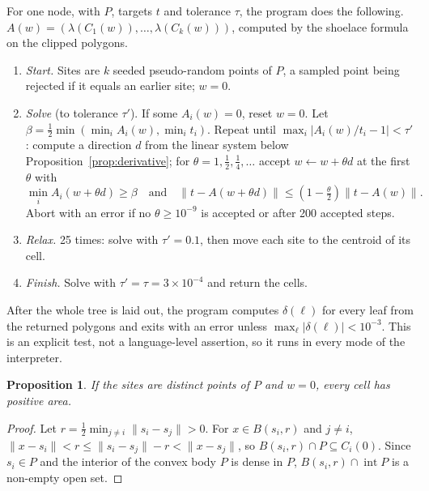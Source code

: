 \documentclass[11pt,a4paper]{article}
\theoremstyle{plain}
\newtheorem{proposition}[theorem]{Proposition}
\theoremstyle{definition}
\theoremstyle{remark}
\newcommand{\area}{\lambda}
\newcommand{\norm}[1]{\lVert #1\rVert}
\newcommand{\interior}{\operatorname{int}}
\begin{document}
For one node, with $P$, targets $t$ and tolerance $\tau$, the program does the
following. $A(w)=(\area(C_1(w)),\dots,\area(C_k(w)))$, computed by the
shoelace formula on the clipped polygons.

\begin{enumerate}[label=\arabic*.]
\item \emph{Start.} Sites are $k$ seeded pseudo-random points of $P$, a sampled point being rejected if it equals an earlier site; $w=0$.
\item \emph{Solve} (to tolerance $\tau'$). If some $A_i(w)=0$, reset $w=0$.
      Let $\beta=\tfrac12\min(\min_i A_i(w),\min_i t_i)$. Repeat until
      $\max_i\lvert A_i(w)/t_i-1\rvert<\tau'$: compute a direction $d$ from
      the linear system below Proposition~\ref{prop:derivative}; for
      $\theta=1,\tfrac12,\tfrac14,\dots$ accept $w\leftarrow w+\theta d$ at
      the first $\theta$ with
      \begin{equation}\label{eq:accept}
        \min_i A_i(w+\theta d)\ge\beta
        \quad\text{and}\quad
        \norm{t-A(w+\theta d)}\le(1-\tfrac\theta2)\norm{t-A(w)} .
      \end{equation}
      Abort with an error if no $\theta\ge 10^{-9}$ is accepted or after 200
      accepted steps.
\item \emph{Relax.} 25 times: solve with $\tau'=0.1$, then move each site to
      the centroid of its cell.
\item \emph{Finish.} Solve with $\tau'=\tau=3\times10^{-4}$ and return the
      cells.
\end{enumerate}
After the whole tree is laid out, the program computes $\delta(\ell)$ for
every leaf from the returned polygons and exits with an error unless
$\max_\ell\lvert\delta(\ell)\rvert<10^{-3}$. This is an explicit test, not a language-level assertion, so it runs in every mode of the interpreter.

\begin{proposition}\label{prop:voronoi}
If the sites are distinct points of $P$ and $w=0$, every cell has positive
area.
\end{proposition}
\begin{proof}
Let $r=\tfrac12\min_{j\ne i}\norm{s_i-s_j}>0$. For $x\in B(s_i,r)$ and $j\ne i$,
$\norm{x-s_i}<r\le\norm{s_i-s_j}-r<\norm{x-s_j}$, so
$B(s_i,r)\cap P\subseteq C_i(0)$. Since $s_i\in P$ and the interior of the
convex body $P$ is dense in $P$, $B(s_i,r)\cap\interior P$ is a non-empty open
set.
\end{proof}
\end{document}
